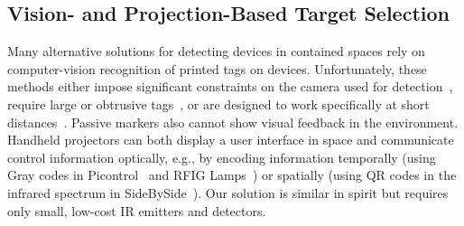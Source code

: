\subsection{Vision- and Projection-Based Target Selection}
Many alternative solutions for detecting devices in contained spaces
rely on computer-vision recognition of printed tags on devices. Unfortunately,
these methods either impose significant constraints on the camera used for
detection~\cite{Bokode}, require large or obtrusive tags~\cite{Dataglyphs}, or
are designed to work specifically at short distances~\cite{CyberCode}. Passive
markers also cannot show visual feedback in the environment.  Handheld
projectors can both display a user interface in space and communicate control
information optically, e.g., by encoding information temporally (using Gray
codes in Picontrol~\cite{schmidt_picontrol:_2012} and RFIG
Lamps~\cite{raskar_rfig_2004}) or spatially (using QR codes in the infrared
spectrum in SideBySide~\cite{willis_sidebyside:_2011}). Our solution is similar
in spirit but requires only small, low-cost IR emitters and detectors.



%
%



